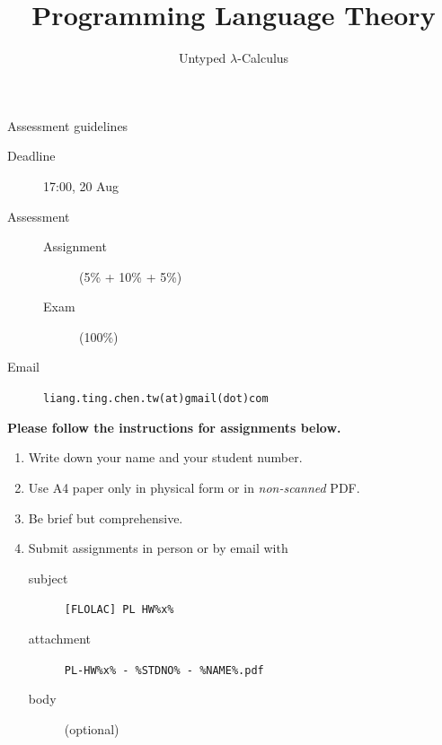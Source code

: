\title{Programming Language Theory}
\subtitle{Untyped $\lambda$-Calculus}


{
\begin{frame}\maketitle\end{frame}}

\begin{frame}[fragile]{Assessment guidelines}
  \begin{description}
    \item[Deadline] 17:00, 20 Aug
    \item[Assessment] 
      \begin{description}
        \item[Assignment] (5\% + 10\% + 5\%)
        \item[Exam] (100\%)
      \end{description}
    \item[Email] \texttt{liang.ting.chen.tw(at)gmail(dot)com}
  \end{description}

  \textbf{Please follow the instructions for assignments below.}

  \begin{enumerate}
    \item Write down your name and your student number. 
    \item Use A4 paper only in physical form or in \emph{non-scanned} PDF. 
    \item Be brief but comprehensive.
    \item Submit assignments in person or by email with 
      \begin{description}
        \item[subject] \texttt{[FLOLAC] PL HW\%x\%}
        \item[attachment] \texttt{PL-HW\%x\% - \%STDNO\% - \%NAME\%.pdf}
        \item[body] (optional)
      \end{description}
  \end{enumerate}
\end{frame}

